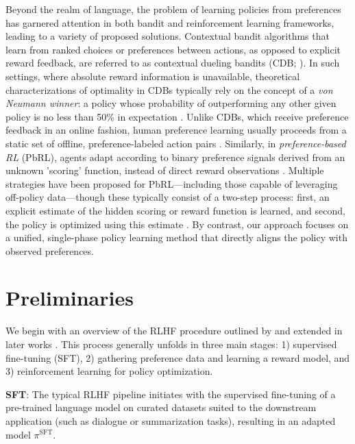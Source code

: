 Beyond the realm of language, the problem of learning policies from preferences has garnered attention in both bandit and reinforcement learning frameworks, leading to a variety of proposed solutions. Contextual bandit algorithms that learn from ranked choices or preferences between actions, as opposed to explicit reward feedback, are referred to as contextual dueling bandits (CDB; \cite{yue2012karmed,dudik2015contextual}). In such settings, where absolute reward information is unavailable, theoretical characterizations of optimality in CDBs typically rely on the concept of a \textit{von Neumann winner}: a policy whose probability of outperforming any other given policy is no less than 50\% in expectation \citep{dudik2015contextual}. Unlike CDBs, which receive preference feedback in an online fashion, human preference learning usually proceeds from a static set of offline, preference-labeled action pairs \citep{yan2022human}. Similarly, in \textit{preference-based RL} (PbRL), agents adapt according to binary preference signals derived from an unknown 'scoring' function, instead of direct reward observations \citep{BusaFekete2014,ruiz2023dueling}. Multiple strategies have been proposed for PbRL—including those capable of leveraging off-policy data—though these typically consist of a two-step process: first, an explicit estimate of the hidden scoring or reward function is learned, and second, the policy is optimized using this estimate \citep{jain2013learning,BusaFekete2014,christiano2017deep,sadigh2017active,kupcsik2018learning}. By contrast, our approach focuses on a unified, single-phase policy learning method that directly aligns the policy with observed preferences.

\section{Preliminaries}\label{section:prelims}

We begin with an overview of the RLHF procedure outlined by \citeauthor{ziegler2020finetuning} and extended in later works \citep{stiennon2022learning, bai2022training, ouyang2022training}. This process generally unfolds in three main stages: 1) supervised fine-tuning (SFT), 2) gathering preference data and learning a reward model, and 3) reinforcement learning for policy optimization.

\textbf{SFT}: The typical RLHF pipeline initiates with the supervised fine-tuning of a pre-trained language model on curated datasets suited to the downstream application (such as dialogue or summarization tasks), resulting in an adapted model $\pi^\text{SFT}$.

